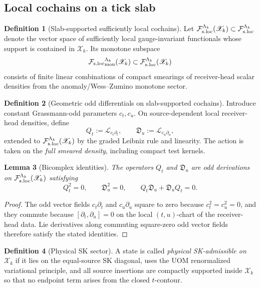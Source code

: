 \documentclass[11pt]{article}
\theoremstyle{definition}
\newtheorem{definition}{Definition}[section]
\theoremstyle{plain}
\newtheorem{lemma}[definition]{Lemma}
\theoremstyle{remark}
\newcommand{\Fsloc}{\mathcal F_{\rm s.loc}}
\newcommand{\Xscr}{\mathscr X}
\newcommand{\Qt}{Q_t}
\newcommand{\Du}{\mathfrak D_u}
\newcommand{\Lie}{\mathcal L}
\begin{document}
\subsection{Local cochains on a tick slab}

\begin{definition}[Slab-supported sufficiently local cochains]
\label{def:uomdesc-floc-slab}
Let \(\Fsloc^{\Lambda_k}(\Xscr_k)\subset \Fsloc^{\Lambda_k}\) denote the vector space of sufficiently
local gauge-invariant functionals whose support is contained in \(\Xscr_k\).
Its monotone subspace
\[
{\Fsloc}_{\rm mon}^{\Lambda_k}(\Xscr_k)\subset \Fsloc^{\Lambda_k}(\Xscr_k)
\]
consists of finite linear combinations of compact smearings of receiver-head scalar densities from
the anomaly/Wess--Zumino monotone sector.
\end{definition}

\begin{definition}[Geometric odd differentials on slab-supported cochains]
\label{def:uomdesc-two-diff}
Introduce constant Grassmann-odd parameters \(c_t,c_u\).
On source-dependent local receiver-head densities, define
\[
\Qt:=\Lie_{c_t\partial_t},
\qquad
\Du:=\Lie_{c_u\partial_u},
\]
extended to \(\Fsloc^{\Lambda_k}(\Xscr_k)\) by the graded Leibniz rule and linearity.
The action is taken on the \emph{full smeared density}, including compact test kernels.
\end{definition}

\begin{lemma}[Bicomplex identities]
\label{lem:uomdesc-bicomplex}
The operators \(\Qt\) and \(\Du\) are odd derivations on
\(\Fsloc^{\Lambda_k}(\Xscr_k)\) satisfying
\[
\Qt^2=0,
\qquad
\Du^2=0,
\qquad
\Qt\Du+\Du\Qt=0.
\]
\end{lemma}

\begin{proof}
The odd vector fields \(c_t\partial_t\) and \(c_u\partial_u\) square to zero because
\(c_t^2=c_u^2=0\), and they commute because \([\partial_t,\partial_u]=0\) on the local
\((t,u)\)-chart of the receiver-head data.
Lie derivatives along commuting square-zero odd vector fields therefore satisfy the stated
identities.
\end{proof}

\begin{definition}[Physical SK sector]
\label{def:uomdesc-sk-adm}
A state is called \emph{physical SK-admissible on \(\Xscr_k\)} if it lies on the equal-source SK
diagonal, uses the UOM renormalized variational principle, and all source insertions are compactly
supported inside \(\Xscr_k\) so that no endpoint term arises from the closed \(t\)-contour.
\end{definition}
\end{document}
